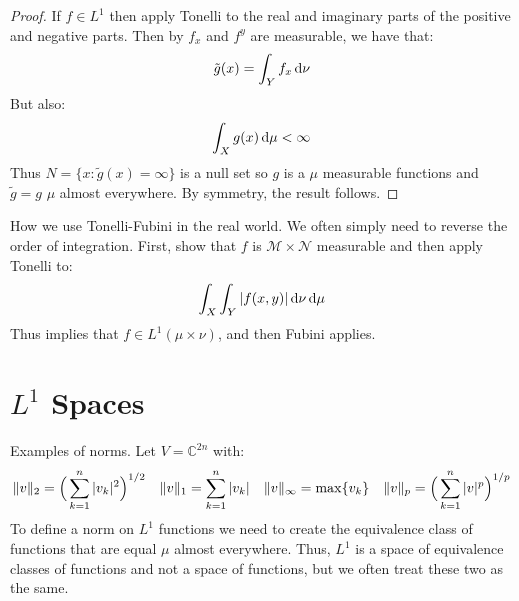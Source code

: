 \documentclass[crop=false,class=article]{standalone}                           %
\begin{document}
        \begin{proof}
            If $f\in{L}^{1}$ then apply Tonelli to the real and imaginary parts
            of the positive and negative parts. Then by $f_{x}$ and $f^{y}$ are
            measurable, we have that:
            \begin{equation}
                \tilde{g}(x)=\int_{Y}f_{x}\mathop{}\!\mathrm{d}\nu
            \end{equation}
            But also:
            \begin{equation}
                \int_{X}g(x)\mathop{}\!\mathrm{d}\mu<\infty
            \end{equation}
            Thus $N=\{x:\tilde{g}(x)=\infty\}$ is a null set so $g$ is a
            $\mu$ measurable functions and $\tilde{g}=g$ $\mu$ almost
            everywhere. By symmetry, the result follows.
        \end{proof}
        How we use Tonelli-Fubini in the real world. We often simply need to
        reverse the order of integration. First, show that $f$ is
        $\mathcal{M}\times\mathcal{N}$ measurable and then apply Tonelli to:
        \begin{equation}
            \int_{X}\int_{Y}|f(x,y)|\mathop{}\!\mathrm{d}\nu\mathop{}\!\mathrm{d}\mu
        \end{equation}
        Thus implies that $f\in{L}^{1}(\mu\times\nu)$, and then Fubini applies.
    \section{$L^{1}$ Spaces}
        Examples of norms. Let $V=\mathbb{C}^{2n}$ with:
        \begin{equation}
            \lVert v\rVert_{2}=\Big(\sum_{k=1}^{n}|v_{k}|^{2}\Big)^{1/2}
            \quad
            \lVert v\rVert_{1}=\sum_{k=1}^{n}|v_{k}|
            \quad
            \lVert v\rVert_{\infty}=\max\{v_{k}\}
            \quad
            \lVert v\rVert_{p}=\Big(\sum_{k=1}^{n}|v|^{p}\Big)^{1/p}
        \end{equation}
        To define a norm on $L^{1}$ functions we need to create the equivalence
        class of functions that are equal $\mu$ almost everywhere. Thus,
        $L^{1}$ is a space of equivalence classes of functions and not a space
        of functions, but we often treat these two as the same.
\end{document}
